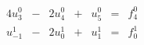 \begin{alignat*}{4}
u_3^0 & {}-{} &  2u_4^0 & {}+{} & u_5^0 & {}={} & f_4^0 \\
u_{-1}^1 & {}-{} &  2u_0^1 & {}+{} & u_1^1 & {}={} & f_0^1
\end{alignat*}